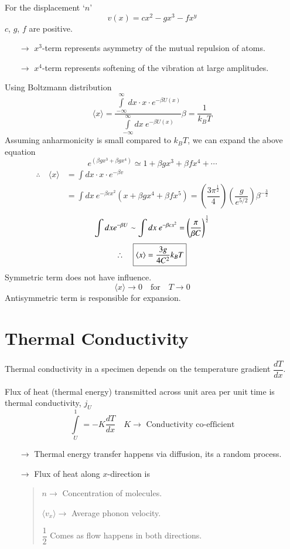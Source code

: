 For the displacement `$n$'
$$
v(x)=cx^{2}-gx^{3}-fx^{y}
$$
$c$, $g$, $f$ are positive.
\begin{itemize}
\itemsep=0pt
\item[$\to$] $x^{3}$-term represents asymmetry of the mutual repulsion of atoms.

\item[$\to$] $x^{4}$-term represents softening of the vibration at large amplitudes.
\end{itemize}
Using Boltzmann distribution
$$
\langle x \rangle = \dfrac{\int\limits^{\infty}_{-\infty}dx\cdot x\cdot e^{-\beta U(x)}}{\int\limits^{\infty}_{-\infty}dx \ e^{-\beta U(x)}}\beta=\dfrac{1}{k_{B}T}
$$
Assuming anharmonicity is small compared to $k_{B}T$, we can expand the above equation
$$
e^{(\beta gx^{3}+\beta gx^{4})}\simeq 1+\beta gx^{3}+\beta fx^{4}+\cdots
$$
\begin{align*}
\therefore\quad \langle x\rangle  &= \int dx\cdot x\cdot e^{-\beta v}\\[3pt]
&= \int dx \ e^{-\beta cx^{2}}(x+\beta gx^{4}+\beta fx^{5})=\left(\dfrac{3\pi^{\frac{1}{2}}}{4}\right)\left(\dfrac{g}{e^{5/2}}\right)\beta^{-\frac{3}{2}}
\end{align*}
\begin{gather*}
\int dx e^{-\beta U}\sim \int dx \ e^{-\beta cx^{2}}=\left(\dfrac{\pi}{\beta C}\right)^{\frac{1}{2}}\\[3pt]
\therefore\quad \fbox{$\langle x \rangle =\dfrac{3g}{4C^{2}}k_{B}T$}
\end{gather*}
Symmetric term does not have influence.
$$
\langle x\rangle \to 0 \quad\text{for}\quad T\to 0
$$
Antisymmetric term is responsible for expansion.

\section*{Thermal Conductivity}

Thermal conductivity in a specimen depends on the temperature gradient $\dfrac{dT}{dx}$.

Flux of heat (thermal energy) transmitted across unit area per unit time is thermal conductivity, $j_{U}$
$$
\int\limits^{1}_{U}=-K\dfrac{dT}{dx}\quad K\to \text{ Conductivity co-efficient}
$$
\begin{itemize}
\item[$\to$] Thermal energy transfer happens via diffusion, its a random process.

\item[$\to$] Flux of heat along $x$-direction is 
\begin{quote}
$n\to$ Concentration of molecules.

$\langle v_{x}\rangle\to$ Average phonon velocity.

$\dfrac{1}{2}$ Comes as flow happens in both directions.
\end{quote}
\end{itemize}


